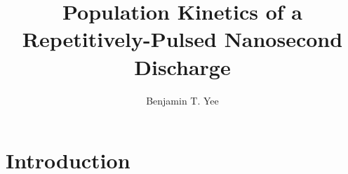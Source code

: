 \documentclass[12pt]{thesis-umich}
\title{Population Kinetics of a Repetitively-Pulsed Nanosecond Discharge}
\author{Benjamin T. Yee}
\begin{document}
  \chapter{Introduction}
    
\end{document}
